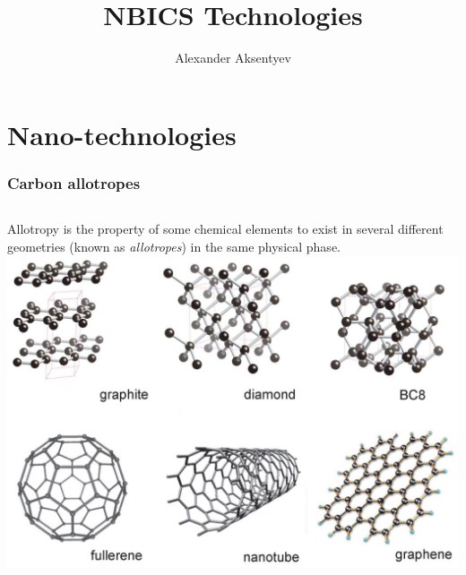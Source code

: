 \documentclass{beamer}
\title{NBICS Technologies}
\author{Alexander Aksentyev}
\institute{National Research Institute ``MEPhI''}
\date{}
\begin{document}
	\begin{frame}
		\titlepage
	\end{frame}

\section{Nano-technologies}

\begin{frame}
	\frametitle{Carbon allotropes}
	\begin{columns}
		\column{.4\textwidth}
		Allotropy is the property of some chemical elements to exist in several different geometries (known as \emph{allotropes}) in the same physical phase.
		\column{.6\textwidth}
		\includegraphics[scale=.45]{CarbAllotropes}
	\end{columns}
\end{frame}
\end{document}
